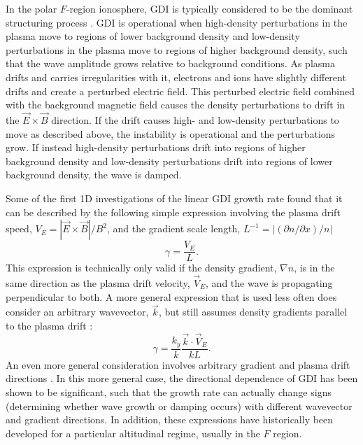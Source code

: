 In the polar \(F\)-region ionosphere, GDI is typically considered to be the dominant structuring process \citep{Weber1984,Cerisier1985,Basu1988,Tsunoda1988,Fukumoto2000}.  GDI is operational when high-density perturbations in the plasma move to regions of lower background density and low-density perturbations in the plasma move to regions of higher background density, such that the wave amplitude grows relative to background conditions.  As plasma drifts and carries irregularities with it, electrons and ions have slightly different drifts and create a perturbed electric field.  This perturbed electric field combined with the background magnetic field causes the density perturbations to drift in the \(\vec{E}\times\vec{B}\) direction.  If the drift causes high- and low-density perturbations to move as described above, the instability is operational and the perturbations grow.  If instead high-density perturbations drift into regions of higher background density and low-density perturbations drift into regions of lower background density, the wave is damped.

Some of the first 1D investigations of the linear GDI growth rate found that it can be described by the following simple expression involving the plasma drift speed, \(V_E = |\vec{E}\times\vec{B}|/B^2\), and the gradient scale length, \(L^{-1} = |(\partial n/\partial x)/n|\) \citep{Simon1963,Hoh1963,Linson1970}
\begin{equation}
	\label{eqn:gdi_old}
	\gamma = \frac{V_E}{L}.
\end{equation}
This expression is technically only valid if the density gradient, \(\nabla n\), is in the same direction as the plasma drift velocity, \(\vec{V}_E\), and the wave is propagating perpendicular to both.  A more general expression that is used less often does consider an arbitrary wavevector, \(\vec{k}\), but still assumes density gradients parallel to the plasma drift \citep{Tsunoda1988}:
\begin{equation}
	\label{eqn:gdi_80s}
	\gamma = \frac{k_y}{k}\frac{\vec{k}\cdot\vec{V}_E}{kL}.
\end{equation}
An even more general consideration involves arbitrary gradient and plasma drift directions \citep{Keskinen1982a,Makarevich2014c}.  In this more general case, the directional dependence of GDI has been shown to be significant, such that the growth rate can actually 
change signs (determining whether wave growth or damping occurs) with different wavevector and gradient directions.  In addition, these expressions have historically been developed for a particular altitudinal regime, usually in the \(F\) region.


